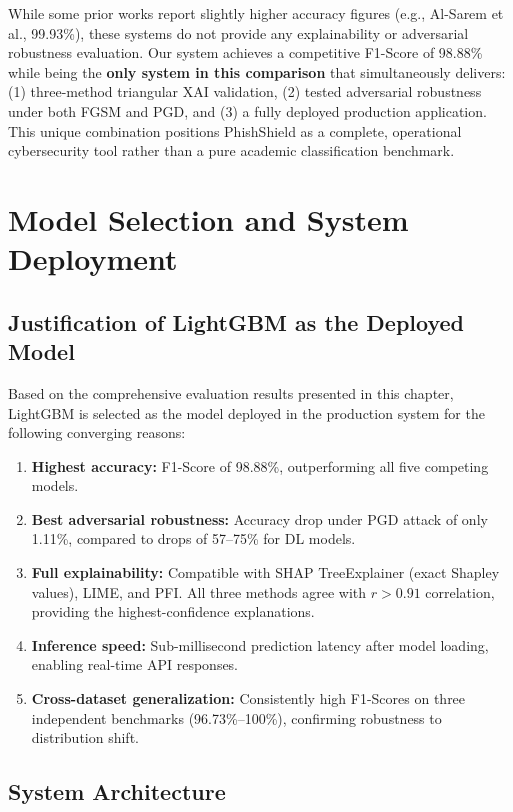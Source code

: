 While some prior works report slightly higher accuracy figures (e.g., Al-Sarem et al., 99.93\%), these systems do not provide any explainability or adversarial robustness evaluation. Our system achieves a competitive F1-Score of 98.88\% while being the \textbf{only system in this comparison} that simultaneously delivers: (1) three-method triangular XAI validation, (2) tested adversarial robustness under both FGSM and PGD, and (3) a fully deployed production application. This unique combination positions PhishShield as a complete, operational cybersecurity tool rather than a pure academic classification benchmark.

\section{Model Selection and System Deployment}

\subsection{Justification of LightGBM as the Deployed Model}

Based on the comprehensive evaluation results presented in this chapter, LightGBM is selected as the model deployed in the production system for the following converging reasons:

\begin{enumerate}
    \item \textbf{Highest accuracy:} F1-Score of 98.88\%, outperforming all five competing models.
    \item \textbf{Best adversarial robustness:} Accuracy drop under PGD attack of only 1.11\%, compared to drops of 57--75\% for DL models.
    \item \textbf{Full explainability:} Compatible with SHAP TreeExplainer (exact Shapley values), LIME, and PFI. All three methods agree with $r > 0.91$ correlation, providing the highest-confidence explanations.
    \item \textbf{Inference speed:} Sub-millisecond prediction latency after model loading, enabling real-time API responses.
    \item \textbf{Cross-dataset generalization:} Consistently high F1-Scores on three independent benchmarks (96.73\%--100\%), confirming robustness to distribution shift.
\end{enumerate}

\subsection{System Architecture}

